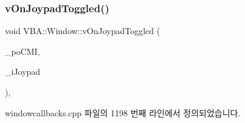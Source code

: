 \subsubsection{\texorpdfstring{v\+On\+Joypad\+Toggled()}{vOnJoypadToggled()}}
{\footnotesize\ttfamily void V\+B\+A\+::\+Window\+::v\+On\+Joypad\+Toggled (\begin{DoxyParamCaption}\item[{Gtk\+::\+Check\+Menu\+Item $\ast$}]{\+\_\+po\+C\+MI,  }\item[{\mbox{\hyperlink{_util_8cpp_a0ef32aa8672df19503a49fab2d0c8071}{int}}}]{\+\_\+i\+Joypad }\end{DoxyParamCaption})\hspace{0.3cm}{\ttfamily [protected]}, {\ttfamily [virtual]}}



windowcallbacks.\+cpp 파일의 1198 번째 라인에서 정의되었습니다.


